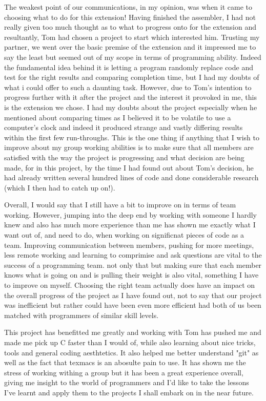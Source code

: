 \documentclass[11pt]{article}
\begin{document}
The weakest point of our communications, in my opinion, was when it came to choosing what to do for this extension! Having finished the assembler, I had not really given too much thought as to what to progress onto for the extension and resultantly, Tom had chosen a project to start which interested him. Trusting my partner, we went over the basic premise of the extension and it impressed me to say the least but seemed out of my scope in terms of programming ability. Indeed the fundamental idea behind it is letting a program randomly replace code and test for the right results and comparing completion time, but I had my doubts of what i could offer to such a daunting task. However, due to Tom's intention to progress further with it after the project and the interest it provoked in me, this is the extension we chose. I had my doubts about the project especially when he mentioned about comparing times as I believed it to be volatile to use a computer's clock and indeed it produced strange and vastly differing results within the first few run-throughs. This is the one thing if anything that I wish to improve about my group working abilities is to make sure that all members are satisfied with the way the project is progressing and what decision are being made, for in this project, by the time I had found out about Tom's decision, he had already written several hundred lines of code and done considerable research (which I then had to catch up on!).

Overall, I would say that I still have a bit to improve on in terms of team working. However, jumping into the deep end by working with someone I hardly knew and also has much more experience than me has shown me exactly what I want out of, and need to do, when working on significnat pieces of code as a team. Improving communication between members, pushing for more meetings, less remote working and learning to comprimise and ask questions are vital to the success of a programming team. not only that but making sure that each member knows what is going on and is pulling their weight is also vital, something I have to improve on myself. Choosing the right team actually does have an impact on the overall progress of the project as I have found out, not to say that our project was inefficient but rather could have been even more efficient had both of us been matched with programmers of similar skill levels.

This project has benefitted me greatly and working with Tom has pushed me and made me pick up C faster than I would of, while also learning about nice tricks, tools and general coding aesthtetics. It also helped me better understand "git" as well as the fact that texmacs is an abosulte pain to use. It has shown me the stress of working withing a group but it has been a great experience overall, giving me insight to the world of programmers and I'd like to take the lessons I've learnt and apply them to the projects I shall embark on in the near future.
\end{document}
